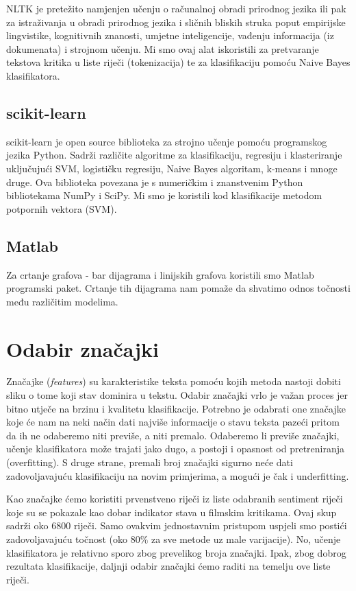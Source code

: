 \documentclass[conference]{IEEEtran}
\begin{document}
NLTK je pretežito namjenjen učenju o računalnoj obradi prirodnog jezika ili pak za istraživanja u obradi prirodnog jezika i sličnih bliskih struka poput empirijske lingvistike, kognitivnih znanosti, umjetne inteligencije, vađenju informacija (iz dokumenata) i strojnom učenju. Mi smo ovaj alat iskoristili za pretvaranje tekstova kritika u liste riječi (tokenizacija) te za klasifikaciju pomoću Naive Bayes klasifikatora.

\subsection{scikit-learn}

scikit-learn je open source biblioteka za strojno učenje pomoću programskog jezika Python. Sadrži različite algoritme za klasifikaciju, regresiju i klasteriranje uključujući SVM, logističku regresiju, Naive Bayes algoritam, k-means i mnoge druge. Ova biblioteka povezana je s numeričkim i znanstvenim Python bibliotekama NumPy i SciPy. Mi smo je koristili kod klasifikacije metodom potpornih vektora (SVM).

\subsection{Matlab}
Za crtanje grafova - bar dijagrama i linijskih grafova koristili smo Matlab programski paket. Crtanje tih dijagrama nam pomaže da shvatimo odnos točnosti među različitim modelima.

\section{Odabir značajki}

Značajke (\textit{features}) su karakteristike teksta pomoću kojih metoda nastoji dobiti sliku o tome koji stav dominira u tekstu. Odabir značajki vrlo je važan proces jer bitno utječe na brzinu i kvalitetu klasifikacije. Potrebno je odabrati one značajke koje će nam na neki način dati najviše informacije o stavu teksta pazeći pritom da ih ne odaberemo niti previše, a niti premalo. Odaberemo li previše značajki, učenje klasifikatora može trajati jako dugo, a postoji i opasnost od pretreniranja (overfitting). S druge strane, premali broj značajki sigurno neće dati zadovoljavajuću klasifikaciju na novim primjerima, a mogući je čak i underfitting.

Kao značajke ćemo koristiti prvenstveno riječi iz liste odabranih sentiment riječi \cite{words} koje su se pokazale kao dobar indikator stava u filmskim kritikama. Ovaj skup sadrži oko 6800 riječi. Samo ovakvim jednostavnim pristupom uspjeli smo postići zadovoljavajuću točnost (oko $80\%$ za sve metode uz male varijacije). No, učenje klasifikatora je relativno sporo zbog prevelikog broja značajki. Ipak, zbog dobrog rezultata klasifikacije, daljnji odabir značajki ćemo raditi na temelju ove liste riječi.
\end{document}
